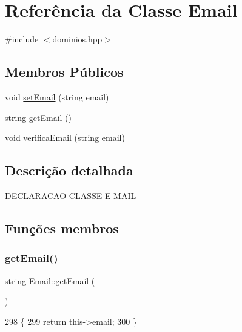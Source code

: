 \hypertarget{class_email}{}\section{Referência da Classe Email}
\label{class_email}


{\ttfamily \#include $<$dominios.\+hpp$>$}

\subsection*{Membros Públicos}
\begin{DoxyCompactItemize}
\item 
void \mbox{\hyperlink{class_email_a2614b3a19d961411d1bece9c1bdf616f}{set\+Email}} (string email)
\item 
string \mbox{\hyperlink{class_email_aa9a0e1a66b4efde65cf017bdd1c6c625}{get\+Email}} ()
\item 
void \mbox{\hyperlink{class_email_ab105064f3488d882a3e432052eea954e}{verifica\+Email}} (string email)
\end{DoxyCompactItemize}


\subsection{Descrição detalhada}
D\+E\+C\+L\+A\+R\+A\+C\+AO C\+L\+A\+S\+SE E-\/\+M\+A\+IL 

\subsection{Funções membros}
\mbox{\label{class_email_aa9a0e1a66b4efde65cf017bdd1c6c625}} 
\subsubsection{\texorpdfstring{get\+Email()}{getEmail()}}
{\footnotesize\ttfamily string Email\+::get\+Email (\begin{DoxyParamCaption}{ }\end{DoxyParamCaption})}


\begin{DoxyCode}
298 \{
299   \textcolor{keywordflow}{return} this->email;
300 \}
\end{DoxyCode}
\mbox{\label{class_email_a2614b3a19d961411d1bece9c1bdf616f}} 
